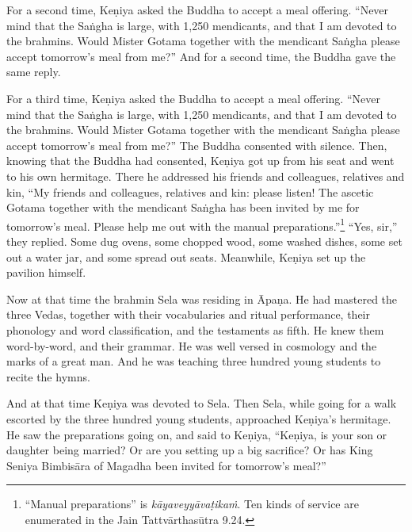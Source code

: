 \documentclass[12pt,openany]{book}%
\begin{document}
For a second time, \textsanskrit{Keṇiya} asked the Buddha to accept a meal offering. “Never mind that the \textsanskrit{Saṅgha} is large, with 1,250 mendicants, and that I am devoted to the brahmins. Would Mister Gotama together with the mendicant \textsanskrit{Saṅgha} please accept tomorrow’s meal from me?” And for a second time, the Buddha gave the same reply. 

For a third time, \textsanskrit{Keṇiya} asked the Buddha to accept a meal offering. “Never mind that the \textsanskrit{Saṅgha} is large, with 1,250 mendicants, and that I am devoted to the brahmins. Would Mister Gotama together with the mendicant \textsanskrit{Saṅgha} please accept tomorrow’s meal from me?” The Buddha consented with silence. Then, knowing that the Buddha had consented, \textsanskrit{Keṇiya} got up from his seat and went to his own hermitage. There he addressed his friends and colleagues, relatives and kin, “My friends and colleagues, relatives and kin: please listen! The ascetic Gotama together with the mendicant \textsanskrit{Saṅgha} has been invited by me for tomorrow’s meal. Please help me out with the manual preparations.”\footnote{“Manual preparations” is \textit{\textsanskrit{kāyaveyyāvaṭikaṁ}}. Ten kinds of service are enumerated in the Jain \textsanskrit{Tattvārthasūtra} 9.24. } “Yes, sir,” they replied. Some dug ovens, some chopped wood, some washed dishes, some set out a water jar, and some spread out seats. Meanwhile, \textsanskrit{Keṇiya} set up the pavilion himself. 

Now at that time the brahmin Sela was residing in \textsanskrit{Āpaṇa}. He had mastered the three Vedas, together with their vocabularies and ritual performance, their phonology and word classification, and the testaments as fifth. He knew them word-by-word, and their grammar. He was well versed in cosmology and the marks of a great man. And he was teaching three hundred young students to recite the hymns. 

And at that time \textsanskrit{Keṇiya} was devoted to Sela. Then Sela, while going for a walk escorted by the three hundred young students, approached \textsanskrit{Keṇiya}’s hermitage. He saw the preparations going on, and said to \textsanskrit{Keṇiya}, “\textsanskrit{Keṇiya}, is your son or daughter being married? Or are you setting up a big sacrifice? Or has King Seniya \textsanskrit{Bimbisāra} of Magadha been invited for tomorrow’s meal?” 
\end{document}
